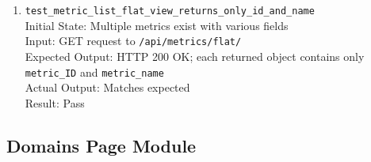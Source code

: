 \documentclass[12pt, titlepage]{article}
\begin{document}
\begin{enumerate}
    \item \texttt{test\_metric\_list\_flat\_view\_returns\_only\_id\_and\_name} \label{test-metric-list-flat-view-returns-only-id-and-name}
      \\Initial State: Multiple metrics exist with various fields
      \\Input: GET request to \texttt{/api/metrics/flat/}
      \\Expected Output: HTTP 200 OK; each returned object contains only \texttt{metric\_ID} and \texttt{metric\_name}
      \\Actual Output: Matches expected
      \\Result: Pass
  \end{enumerate}
\subsection{Domains Page Module}
\end{document}
